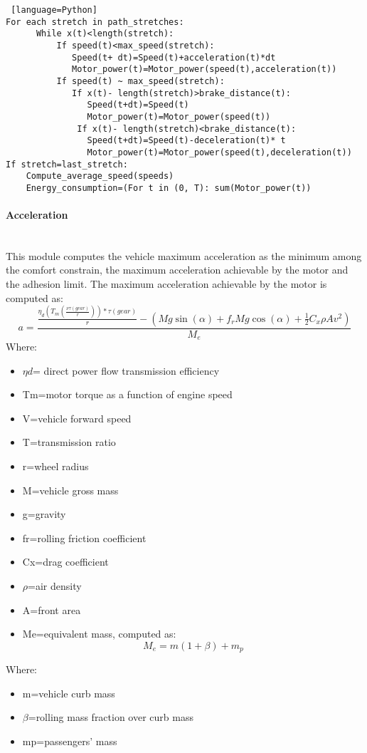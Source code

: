 \documentclass{article}
\newcommand{\subsubsubsection}[1]{\paragraph{#1}\mbox{}\\}
\begin{document}
\begin{lstlisting} [language=Python]
For each stretch in path_stretches: 
      While x(t)<length(stretch): 
          If speed(t)<max_speed(stretch): 
             Speed(t+ dt)=Speed(t)+acceleration(t)*dt
             Motor_power(t)=Motor_power(speed(t),acceleration(t)) 
          If speed(t) ~ max_speed(stretch): 
             If x(t)- length(stretch)>brake_distance(t): 
                Speed(t+dt)=Speed(t) 
                Motor_power(t)=Motor_power(speed(t)) 
              If x(t)- length(stretch)<brake_distance(t): 
                Speed(t+dt)=Speed(t)-deceleration(t)* t 
                Motor_power(t)=Motor_power(speed(t),deceleration(t)) 
If stretch=last_stretch: 
    Compute_average_speed(speeds) 
    Energy_consumption=(For t in (0, T): sum(Motor_power(t)) 
\end{lstlisting}
\subsubsubsection{Acceleration}
This module computes the vehicle maximum acceleration as the minimum among the comfort constrain, the maximum acceleration achievable by the motor and the adhesion limit. The maximum acceleration achievable by the motor is computed as:\\
\begin{equation}
a=\frac{\frac{\eta_{d}(T_{m}(\frac{\nu\tau(gear)}{r}))*\tau(gear)}{r} -(Mg\sin(\alpha)+f_{r}Mg\cos(\alpha)+\frac{1}{2}C_{x}\rho Av^2)}{M_{e}}
\end{equation}
Where:
\begin{itemize}
\item $\eta d$= direct power flow transmission efficiency 
\item Tm=motor torque as a function of engine speed 
\item V=vehicle forward speed 
\item T=transmission ratio 
\item r=wheel radius 
\item M=vehicle gross mass 
\item g=gravity 
\item fr=rolling friction coefficient 
\item Cx=drag coefficient 
\item $\rho$=air density 
\item A=front area 
\item Me=equivalent mass, computed as: 
\begin{equation}
M_{e}=m(1+\beta)+m_{p}
\end{equation}
\end{itemize}
Where:
\begin{itemize}
\item m=vehicle curb mass 
\item $\beta$=rolling mass fraction over curb mass 
\item mp=passengers’ mass 
\end{itemize}
\end{document}
